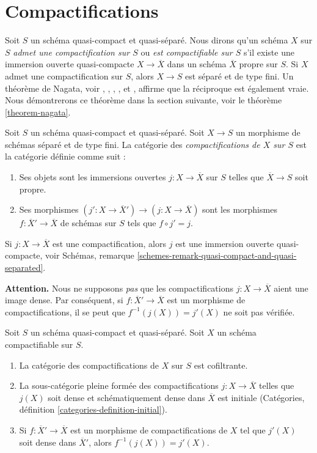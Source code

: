 \section{Compactifications}
\label{section-compactify}

\noindent
Soit $S$ un schéma quasi-compact et quasi-séparé. Nous dirons qu'un
schéma $X$ sur $S$ {\it admet une compactification sur $S$}
ou {\it est compactifiable sur $S$} s'il existe
une immersion ouverte quasi-compacte $X \to \overline{X}$ dans un schéma
$\overline{X}$ propre sur $S$. Si $X$ admet une compactification sur
$S$, alors $X \to S$ est séparé et de type fini. Un théorème de
Nagata, voir \cite{Lutkebohmert}, \cite{Conrad-Nagata}, \cite{Nagata-1},
\cite{Nagata-2}, \cite{Nagata-3} et \cite{Nagata-4},
affirme que la réciproque est également vraie. Nous démontrerons ce théorème
dans la section suivante, voir le théorème \ref{theorem-nagata}.

\medskip\noindent
Soit $S$ un schéma quasi-compact et quasi-séparé.
Soit $X \to S$ un morphisme de schémas séparé et de type fini. La catégorie
des {\it compactifications de $X$ sur $S$} est la catégorie définie
comme suit :
\begin{enumerate}
\item Ses objets sont les immersions ouvertes $j : X \to \overline{X}$ sur $S$ telles que
$\overline{X} \to S$ soit propre.
\item Ses morphismes $(j' : X \to \overline{X}') \to (j : X \to \overline{X})$
sont les morphismes $f : \overline{X}' \to \overline{X}$ de schémas sur $S$
tels que $f \circ j' = j$.
\end{enumerate}
Si $j : X \to \overline{X}$ est une compactification, alors $j$ est une
immersion ouverte quasi-compacte, voir
Schémas, remarque \ref{schemes-remark-quasi-compact-and-quasi-separated}.

\medskip\noindent
{\bf Attention.} Nous ne supposons {\it pas} que les compactifications $j : X \to \overline{X}$
aient une image dense. Par conséquent, si $f : \overline{X}' \to \overline{X}$
est un morphisme de compactifications, il se peut que
$f^{-1}(j(X)) = j'(X)$ ne soit pas vérifiée.

\begin{lemma}
\label{lemma-compactifications-cofiltered}
Soit $S$ un schéma quasi-compact et quasi-séparé.
Soit $X$ un schéma compactifiable sur $S$.
\begin{enumerate}
\item[(a)] La catégorie des compactifications de $X$ sur $S$ est
cofiltrante.
\item[(b)] La sous-catégorie pleine formée des compactifications
$j : X \to \overline{X}$ telles que $j(X)$ soit dense et
schématiquement dense dans $\overline{X}$ est initiale
(Catégories, définition \ref{categories-definition-initial}).
\item[(c)] Si $f : \overline{X}' \to \overline{X}$ est un morphisme
de compactifications de $X$ tel que $j'(X)$ soit dense dans $\overline{X}'$,
alors $f^{-1}(j(X)) = j'(X)$.
\end{enumerate}
\end{lemma}

